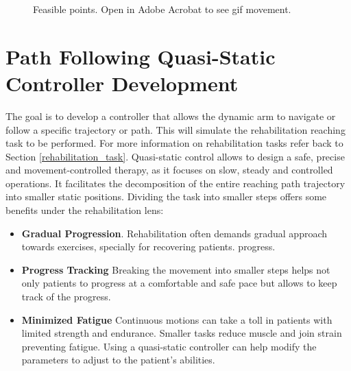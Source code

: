 \begin{figure}[ht]
    \centering
    \caption{Feasible points. Open in Adobe Acrobat to see gif movement.}
    
\end{figure}

\newpage
\section{Path Following Quasi-Static Controller Development } \label{sec:path}

The goal is to develop a controller that allows the dynamic arm  to navigate or follow a specific trajectory or path. This will simulate the rehabilitation reaching task to be performed. For more information on rehabilitation tasks refer back to Section \ref{rehabilitation_task}. Quasi-static control allows to design a safe, precise and movement-controlled therapy, as it focuses on slow, steady and controlled operations. It facilitates the decomposition of the entire reaching path trajectory into smaller static positions. Dividing the task into smaller steps offers some benefits under the rehabilitation lens:
\begin{itemize}
    \item \textbf{Gradual Progression}. Rehabilitation often demands gradual approach towards exercises, specially for recovering patients. progress.
    \item \textbf{Progress Tracking} Breaking the movement into smaller steps helps not only patients to progress at a comfortable and safe pace but allows to keep track of the progress.
    \item \textbf{Minimized Fatigue} Continuous motions can take a toll in patients with limited strength and endurance. Smaller tasks reduce muscle and join strain preventing fatigue. Using a quasi-static controller can help modify the parameters to adjust to the patient's abilities. 
\end{itemize}

